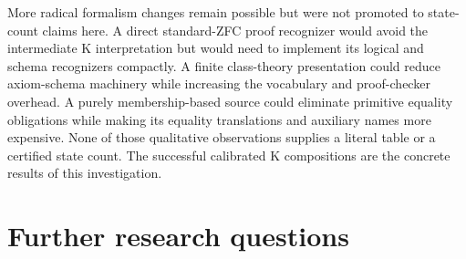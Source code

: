 More radical formalism changes remain possible but were not promoted
to state-count claims here. A direct standard-ZFC proof recognizer would
avoid the intermediate K interpretation but would need to implement
its logical and schema recognizers compactly. A finite class-theory
presentation could reduce axiom-schema machinery while increasing the
vocabulary and proof-checker overhead. A purely membership-based
source could eliminate primitive equality obligations while making
its equality translations and auxiliary names more expensive. None
of those qualitative observations supplies a literal table or a
certified state count. The successful calibrated K compositions are
the concrete results of this investigation.

\section{Further research questions}
\label{sec:future}


